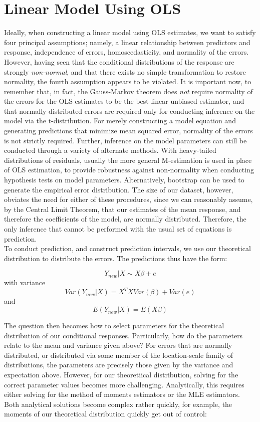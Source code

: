 \documentclass[12pt, a4paper, openany]{book}
\newcommand\tab[1][1cm]{\hspace*{#1}}
\begin{document}
	\section{Linear Model Using OLS}
	\tab Ideally, when constructing a linear model using OLS estimates, we want to satisfy four principal assumptions; namely, a linear relationship between predictors and response, independence of errors, homoscedasticity, and normality of the errors. However, having seen that the conditional distributions of the response are strongly \textit{non-normal}, and that there exists no simple transformation to restore normality, the fourth assumption appears to be violated. It is important now, to remember that, in fact, the Gauss-Markov theorem does \textit{not} require normality of the errors for the OLS estimates to be the best linear unbiased estimator, and that normally distributed errors are required only for conducting inference on the model via the t-distribution. For merely constructing a model equation and generating predictions that minimize mean squared error, normality of the errors is not strictly required. Further, inference on the model parameters can still be conducted through a variety of alternate methods. With heavy-tailed distributions of residuals, usually the more general M-estimation is used in place of OLS estimation, to provide robustness against non-normality when conducting hypothesis tests on model parameters. Alternatively, bootstrap can be used to generate the empirical error distribution. The size of our dataset, however, obviates the need for either of these procedures, since we can reasonably assume, by the Central Limit Theorem, that our estimates of the mean response, and therefore the coefficients of the model, are normally distributed. Therefore, the only inference that cannot be performed with the usual set of equations is prediction. \\
	\tab To conduct prediction, and construct prediction intervals, we use our theoretical distribution to distribute the errors. The predictions thus have the form: \begin{center}
	$$Y_{new}|X\sim X\beta + e$$
	with variance
	$$Var(Y_{new}|X) = X^TXVar(\beta) + Var(e)$$
	and
	$$E(Y_{new}|X) = E(X\beta)$$
	\end{center} 
	\tab The question then becomes how to select parameters for the theoretical distribution of our conditional responses. Particularly, how do the parameters relate to the mean and variance given above?  For errors that are normally distributed, or distributed via some member of the location-scale family of distributions, the parameters are precisely those given by the variance and expectation above. However, for our theoretiical distribution, solving for the correct parameter values becomes more challenging. Analytically, this requires either solving for the method of moments estimators or the MLE estimators. Both analytical solutions become complex rather quickly, for example, the moments of our theoretical distribution quickly get out of control:
\end{document}
